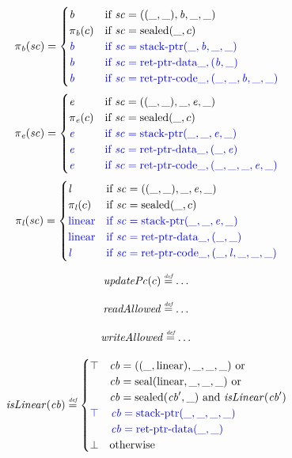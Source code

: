 \documentclass[a3paper]{article}
\newcommand{\defeq}{\stackrel{\textit{\tiny{def}}}{=}}
\newcommand{\tand}{\text{ and }}
\newcommand{\tor}{\text{ or }}
\newcommand{\totherwise}{\text{otherwise }}
\newcommand{\sourcecolor}{\color{blue}}
\newcommand{\src}[1]{{\sourcecolor #1}}
\newcommand{\shareddom}[1]{\mathrm{#1}}
\newcommand{\lin}{\var{l}}
\newcommand{\stkptr}[1]{\mathrm{stack\text{-}ptr}(#1)}
\newcommand{\retptrd}{\mathrm{ret\text{-}ptr\text{-}data}}
\newcommand{\retptrc}{\mathrm{ret\text{-}ptr\text{-}code}}
\newcommand{\seal}[1]{\shareddom{seal}(#1)}
\newcommand{\sealed}[1]{\shareddom{sealed}(#1)}
\newcommand{\var}[1]{\mathit{#1}}
\newcommand{\vsc}{\var{sc}}
\newcommand{\cb}{\var{cb}}
\newcommand{\baddr}{\var{b}}
\newcommand{\eaddr}{\var{e}}
\newcommand{\plainlinearity}[1]{\mathrm{#1}}
\newcommand{\linear}{\plainlinearity{linear}}
\newcommand{\plainfun}[2]{
  \ifthenelse{\equal{#2}{}}
  {\mathit{#1}}
  {\mathit{#1}(#2)}
}
\newcommand{\isLinear}[1]{\plainfun{isLinear}{#1}}
\newcommand{\readAllowed}[1]{\plainfun{readAllowed}{#1}}
\newcommand{\updPcAddr}[1]{\plainfun{updatePc}{#1}}
\newcommand{\writeAllowed}[1]{\plainfun{writeAllowed}{#1}}
\begin{document}
\[
  \pi_\baddr(\vsc) =
  \begin{cases}
    \baddr & \text{if $\vsc = ((\_,\_),\baddr,\_,\_)$} \\ 
    \pi_\baddr(c) & \text{if $\vsc = \sealed{\_,c}$} \\ 
    \src{\baddr} & \src{\text{if $\vsc = \stkptr{\_,\baddr,\_,\_}$}} \\ 
    \src{\baddr} & \src{\text{if $\vsc = \retptrd{\_,(\baddr,\_)}$}} \\ 
    \src{\baddr} & \src{\text{if $\vsc = \retptrc{\_,(\_,\_,\baddr,\_,\_)}$}}
  \end{cases}
\]
\[
  \pi_\eaddr(\vsc) =
  \begin{cases}
    \eaddr & \text{if $\vsc = ((\_,\_),\_,\eaddr,\_)$} \\ 
    \pi_\eaddr(c) & \text{if $\vsc = \sealed{\_,c}$} \\ 
    \src{\eaddr} & \src{\text{if $\vsc = \stkptr{\_,\_,\eaddr,\_}$}} \\ 
    \src{\eaddr} & \src{\text{if $\vsc = \retptrd{\_,(\_,\eaddr)}$}} \\ 
    \src{\eaddr} & \src{\text{if $\vsc = \retptrc{\_,(\_,\_,\_,\eaddr,\_)}$}}
  \end{cases}
\]
\[
  \pi_\lin(\vsc) = 
  \begin{cases}
    \lin & \text{if $\vsc = ((\_,\_),\_,\eaddr,\_)$} \\ 
    \pi_\lin(c) & \text{if $\vsc = \sealed{\_,c}$} \\ 
    \src{\linear} & \src{\text{if $\vsc = \stkptr{\_,\_,\eaddr,\_}$}} \\ 
    \src{\linear} & \src{\text{if $\vsc = \retptrd{\_,(\_,\_)}$}} \\ 
    \src{\lin} & \src{\text{if $\vsc = \retptrc{\_,(\_,\lin,\_,\_,\_)}$}}
  \end{cases}
\]


\[
  \updPcAddr{c} \defeq \dots
\]

\[
  \readAllowed{} \defeq \dots
\]

\[
  \writeAllowed{} \defeq \dots
\]

\[
  \isLinear{\cb} \defeq
  \begin{cases}
    \top & 
    \arraycolsep=0pt
    \begin{array}[t]{l}
      \cb = ((\_,\linear),\_,\_,\_) \tor\\
      \cb = \seal{\linear,\_,\_,\_} \tor\\
      \cb = \sealed{\cb',\_} \tand \isLinear{\cb'} 
    \end{array}\\
    \src{\top} & 
    \sourcecolor\left.
    \arraycolsep=0pt
    \begin{array}[t]{l}
      \cb = \stkptr{\_,\_,\_,\_}\\
      \cb = \retptrd(\_,\_)
    \end{array}\right.\\
    \bot & \totherwise
  \end{cases}
\]
\end{document}
